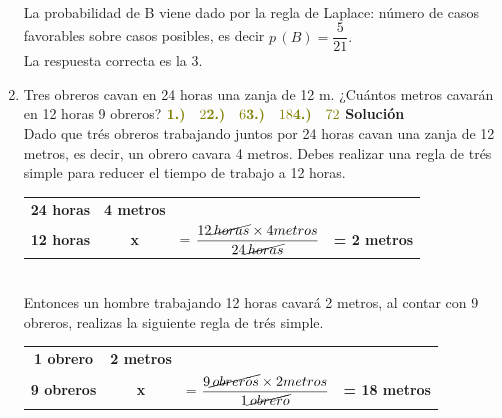 \documentclass[11pt, a4paper]{article} %
\theoremstyle{dotlessP}
\theoremstyle{dotlessS}
\begin{document}
\begin{enumerate}[label=\color{dg}\theenumi.]
	\\
	La probabilidad de B viene dado por la regla de Laplace: 	número de casos favorables sobre casos posibles, es decir 		\textbf {\(p\,(B) = \dfrac{5}{21}.\)}\\
	{\color{dh} La respuesta correcta es la 3.}
	\item {\color{db} Tres obreros cavan en 24 horas una 		zanja de 12 m. ¿Cuántos metros cavarán en 12 horas 9 		obreros?
        }
        \(
\vspace{1\baselineskip} \\ 	
     {\color{dh} \textbf{1.)} \quad 2} \vspace{1\baselineskip} \\ 	
     {\color{dh} \textbf{2.)} \quad 6} \vspace{1\baselineskip} \\ 	
     {\color{dh} \textbf{3.)} \quad 18} \vspace{1\baselineskip} \\ 	
     {\color{dh} \textbf{4.)} \quad 72}   \vspace{1\baselineskip} \\ 	
      \)
        \textbf{Solución} 
	\\ Dado que trés obreros  trabajando juntos por 24 horas 	cavan una zanja de 12 metros, es decir, un obrero cavara 4 		metros.  Debes realizar una regla de trés simple para 		reducer el tiempo de trabajo a  12 horas.       
	\begin{table}[htbp]
	\centering
		\begin{tabular}{cccc}
		\textbf{24 horas} & \textbf{4 metros} &             &                  \\
		\textbf{12 horas} & \textbf{x}        & = 					$\displaystyle\frac{12 \cancel{\,horas} \times 4 			metros }{24 \cancel {\,horas}}$ & \textbf{= 2 metros}
		\end{tabular}
	\end{table}
 	\\ 
	Entonces un hombre trabajando 12 horas  cavará 2 metros, 	al contar con 9 obreros, realizas la siguiente regla de 	trés simple.
	\begin{table}[htbp]
	\centering
		\begin{tabular}{cccc}
		\textbf{1 obrero} & \textbf{2 metros} &             &                  \\
		\textbf{9 obreros} & \textbf{x}      &= 					$\displaystyle\frac{9 \cancel{\,obreros} \times 2 			metros }{1 \cancel {\,obrero}}$ & \textbf{= 18 				metros}

\end{tabular}
\end{table}
\end{enumerate}
\end{document}
